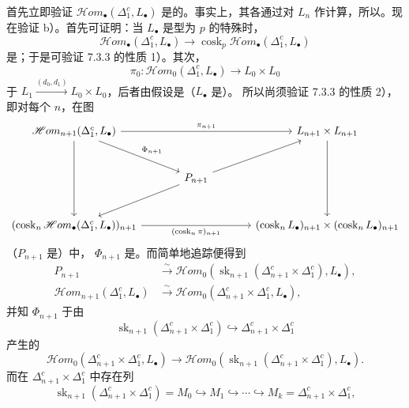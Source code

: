 首先立即验证 $\mathscr Hom_\bullet(\Delta_1^c,L_\bullet)$ 是的。事实上，其各通过对 $L_n$ 作计算，所以。现在验证 b）。首先可证明：当 $L_\bullet$ 是型为 $p$ 的特殊时，
\[\mathscr Hom_\bullet(\Delta_1^c,L_\bullet)\longrightarrow\operatorname{cosk}_p\mathscr Hom_\bullet(\Delta_1^c,L_\bullet)\]
是；于是可验证 7.3.3 的性质 1）。其次，
\[\pi_0:\mathscr Hom_0(\Delta_1^c,L_\bullet)\longrightarrow L_0\times L_0\]
于 $L_1\xrightarrow{(d_0,d_1)}L_0\times L_0$，后者由假设是（$L_\bullet$ 是）。
所以尚须验证 7.3.3 的性质 2），即对每个 $n$，在图
\[\begin{tikzcd}[column sep=large,row sep=large]
\mathscr Hom_{n+1}(\Delta_1^c,L_\bullet)\arrow[rr,"\pi_{n+1}"]\arrow[dd]\arrow[dr,"\Phi_{n+1}"]&&L_{n+1}\times L_{n+1}\arrow[dd]\\
&P_{n+1}\arrow[ur]\arrow[dl]&\\
(\operatorname{cosk}_n\mathscr Hom_\bullet(\Delta_1^c,L_\bullet))_{n+1}\arrow[rr,"(\operatorname{cosk}_n\pi)_{n+1}"']&&(\operatorname{cosk}_nL_\bullet)_{n+1}\times(\operatorname{cosk}_nL_\bullet)_{n+1}
\end{tikzcd}\]
（$P_{n+1}$ 是）中， $\Phi_{n+1}$ 是。而简单地追踪便得到
\begin{align*}
P_{n+1}&\xrightarrow{\sim}\mathscr Hom_0(\operatorname{sk}_{n+1}(\Delta_{n+1}^c\times\Delta_1^c),L_\bullet),\\
\mathscr Hom_{n+1}(\Delta_1^c,L_\bullet)&\xrightarrow{\sim}\mathscr Hom_0(\Delta_{n+1}^c\times\Delta_1^c,L_\bullet),
\end{align*}
并知 $\Phi_{n+1}$ 于由
\[\operatorname{sk}_{n+1}(\Delta_{n+1}^c\times\Delta_1^c)\hookrightarrow\Delta_{n+1}^c\times\Delta_1^c\]
产生的
\[\mathscr Hom_0(\Delta_{n+1}^c\times\Delta_1^c,L_\bullet)\longrightarrow\mathscr Hom_0(\operatorname{sk}_{n+1}(\Delta_{n+1}^c\times\Delta_1^c),L_\bullet).\]
而在 $\Delta_{n+1}^c\times\Delta_1^c$ 中存在列
\[\operatorname{sk}_{n+1}(\Delta_{n+1}^c\times\Delta_1^c)=M_0\hookrightarrow M_1\hookrightarrow\cdots\hookrightarrow M_k=\Delta_{n+1}^c\times\Delta_1^c,\]
